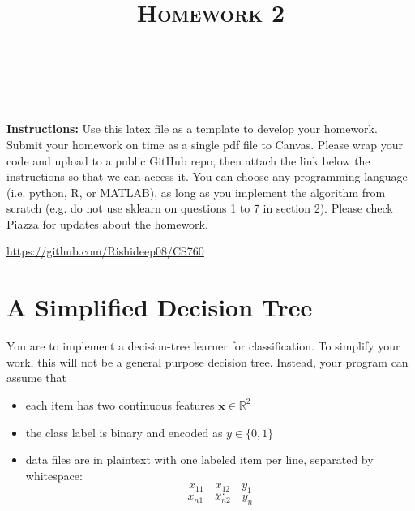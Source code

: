 \documentclass[a4paper]{article}
\title{\textsc{Homework 2}} %
\author{
\red{RISHIDEEP REDDY RALLABANDI} \\
\red{9084949099}\\
}
\date{}
\theoremstyle{definition}
\newcommand{\RR}{\mathbb{R}}
\newcommand{\red}[1]{\textcolor{red}{#1}}
\def\x{\mathbf x}
\begin{document}
\maketitle 


\textbf{Instructions:} 
Use this latex file as a template to develop your homework. Submit your homework on time as a single pdf file to Canvas. Please wrap your code and upload to a public GitHub repo, then attach the link below the instructions so that we can access it. You can choose any programming language (i.e. python, R, or MATLAB), as long as you implement the algorithm from scratch (e.g. do not use sklearn on questions 1 to 7 in section 2). Please check Piazza for updates about the homework.

\red{\href{https://github.com/Rishideep08/CS760}{https://github.com/Rishideep08/CS760}}

\section{A Simplified Decision Tree}
You are to implement a decision-tree learner for classification.
To simplify your work, this will not be a general purpose decision tree.  Instead, your program can assume that
\begin{itemize}
\item each item has two continuous features $\x \in \RR^2$
\item the class label is binary and encoded as $y \in \{0,1\}$
\item data files are in plaintext with one labeled item per line, separated by whitespace:
$$x_{11} \quad x_{12} \quad y_1$$
$$...$$
$$x_{n1} \quad x_{n2} \quad y_n$$
\end{itemize}
\end{document}
